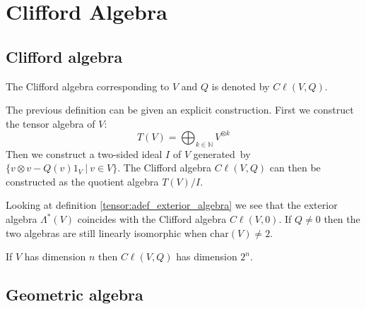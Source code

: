 \chapter{Clifford Algebra}

\section{Clifford algebra}

	\begin{notation}
		The Clifford algebra corresponding to $V$ and $Q$ is denoted by $C\ell(V, Q)$.
	\end{notation}
	
	\begin{construct}
		The previous definition can be given an explicit construction. First we construct the tensor algebra of $V$:
		\begin{equation}
			T(V) = \bigoplus_{k\in\mathbb{N}}V^{\otimes k}
		\end{equation}
		Then we construct a two-sided ideal $I$ of $V$ generated\footnotemark\ by $\{v\otimes v - Q(v)1_V\ |\ v\in V\}$. The Clifford algebra $C\ell(V, Q)$ can then be constructed as the quotient algebra $T(V)/I$.
	\end{construct}
	
	\begin{remark}
		Looking at definition \ref{tensor:adef_exterior_algebra} we see that the exterior algebra $\Lambda^*(V)$ coincides with the Clifford algebra $C\ell(V, 0)$. If $Q\neq0$ then the two algebras are still linearly isomorphic when $\text{char}(V)\neq2$.
	\end{remark}
	
	\begin{property}[Dimension]
		If $V$ has dimension $n$ then $C\ell(V, Q)$ has dimension $2^n$.	
	\end{property}
	
\section{Geometric algebra}

